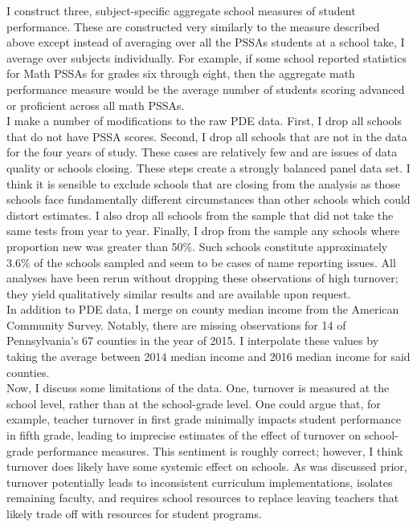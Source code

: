 \documentclass[12pt]{report}
\begin{document}
\indent I construct three, subject-specific aggregate school measures of student performance. These are constructed very similarly to the measure described above except instead of averaging over all the PSSAs students at a school take, I average over subjects individually. For example, if some school reported statistics for Math PSSAs for grades six through eight, then the aggregate math performance measure would be the average number of students scoring advanced or proficient across all math PSSAs. \\
\indent I make a number of modifications to the raw PDE data. First, I drop all schools that do not have PSSA scores. Second, I drop all schools that are not in the data for the four years of study. These cases are relatively few and are issues of data quality or schools closing. These steps create a strongly balanced panel data set. I think it is sensible to exclude schools that are closing from the analysis as those schools face fundamentally different circumstances than other schools which could distort estimates. I also drop all schools from the sample that did not take the same tests from year to year. Finally, I drop from the sample any schools where proportion new was greater than 50\%. Such schools constitute approximately 3.6\% of the schools sampled and seem to be cases of name reporting issues. All analyses have been rerun without dropping these observations of high turnover; they yield qualitatively similar results and are available upon request. \\
\indent In addition to PDE data, I merge on county median income from the American Community Survey. Notably, there are missing observations for 14 of Pennsylvania's 67 counties in the year of 2015. I interpolate these values by taking the average between 2014 median income and 2016 median income for said counties.  \\
\indent Now, I discuss some limitations of the data. One, turnover is measured at the school level, rather than at the school-grade level. One could argue that, for example, teacher turnover in first grade minimally impacts student performance in fifth grade, leading to imprecise estimates of the effect of turnover on school-grade performance measures. This sentiment is roughly correct; however, I think turnover does likely have some systemic effect on schools. As was discussed prior, turnover potentially leads to inconsistent curriculum implementations, isolates remaining faculty, and requires school resources to replace leaving teachers that likely trade off with resources for student programs.\\
\end{document}
